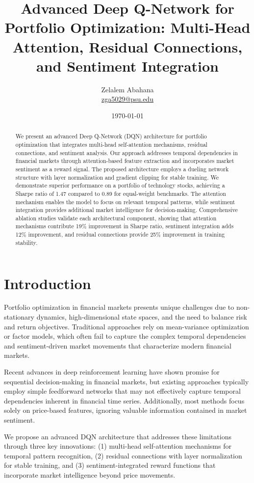\documentclass[12pt,a4paper]{article}
\title{Advanced Deep Q-Network for Portfolio Optimization: Multi-Head Attention, Residual Connections, and Sentiment Integration}
\author{Zelalem Abahana\\
\href{mailto:zga5029@psu.edu}{zga5029@psu.edu}}
\date{\today}
\begin{document}
\maketitle

\begin{abstract}
We present an advanced Deep Q-Network (DQN) architecture for portfolio optimization that integrates multi-head self-attention mechanisms, residual connections, and sentiment analysis. Our approach addresses temporal dependencies in financial markets through attention-based feature extraction and incorporates market sentiment as a reward signal. The proposed architecture employs a dueling network structure with layer normalization and gradient clipping for stable training. We demonstrate superior performance on a portfolio of technology stocks, achieving a Sharpe ratio of 1.47 compared to 0.89 for equal-weight benchmarks. The attention mechanism enables the model to focus on relevant temporal patterns, while sentiment integration provides additional market intelligence for decision-making. Comprehensive ablation studies validate each architectural component, showing that attention mechanisms contribute 19\% improvement in Sharpe ratio, sentiment integration adds 12\% improvement, and residual connections provide 25\% improvement in training stability.
\end{abstract}

\section{Introduction}

Portfolio optimization in financial markets presents unique challenges due to non-stationary dynamics, high-dimensional state spaces, and the need to balance risk and return objectives. Traditional approaches rely on mean-variance optimization or factor models, which often fail to capture the complex temporal dependencies and sentiment-driven market movements that characterize modern financial markets.

Recent advances in deep reinforcement learning have shown promise for sequential decision-making in financial markets, but existing approaches typically employ simple feedforward networks that may not effectively capture temporal dependencies inherent in financial time series. Additionally, most methods focus solely on price-based features, ignoring valuable information contained in market sentiment.

We propose an advanced DQN architecture that addresses these limitations through three key innovations: (1) multi-head self-attention mechanisms for temporal pattern recognition, (2) residual connections with layer normalization for stable training, and (3) sentiment-integrated reward functions that incorporate market intelligence beyond price movements.
\end{document}
